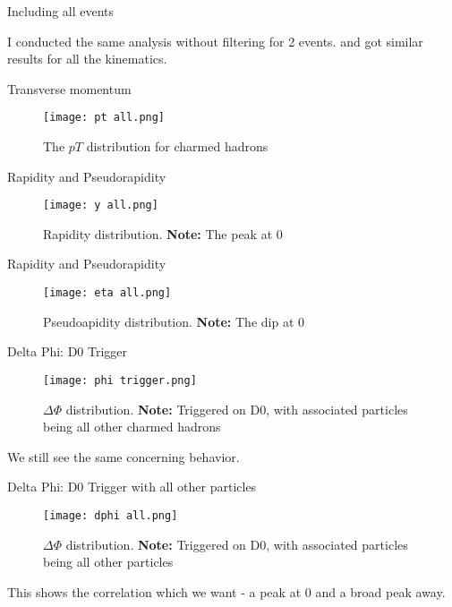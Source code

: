 \documentclass[10pt]{beamer}
\begin{document}
\begin{frame}{Including all events}

I conducted the same analysis without filtering for 2 events. and got similar results for all the kinematics.
    
\end{frame}

\begin{frame}{Transverse momentum}
\begin{figure}
    \centering
    \texttt{[image: pt all.png]}
    \caption{The $pT$ distribution for charmed hadrons}
\end{figure}
\end{frame}

\begin{frame}{Rapidity and Pseudorapidity}
    \begin{figure}
        \centering
        \texttt{[image: y all.png]}
        \caption{Rapidity distribution. \textbf{Note:} The peak at 0}
    \end{figure}
\end{frame}

\begin{frame}{Rapidity and Pseudorapidity}
    \begin{figure}
        \centering
        \texttt{[image: eta all.png]}
        \caption{Pseudoapidity distribution. \textbf{Note:} The dip at 0}
    \end{figure}
\end{frame}

\begin{frame}{Delta Phi: D0 Trigger}
\begin{figure}
    \centering
    \texttt{[image: phi trigger.png]}
    \caption{$\Delta\Phi$ distribution. \textbf{Note:} Triggered on D0, with associated particles being all other charmed hadrons}
\end{figure}
We still see the same concerning behavior.
\end{frame}

\begin{frame}{Delta Phi: D0 Trigger with all other particles}
\begin{figure}
    \centering
    \texttt{[image: dphi all.png]}
    \caption{$\Delta\Phi$ distribution. \textbf{Note:} Triggered on D0, with associated particles being all other particles}
\end{figure}
This shows the correlation which we want - a peak at 0 and a broad peak away.
\end{frame}
\end{document}
